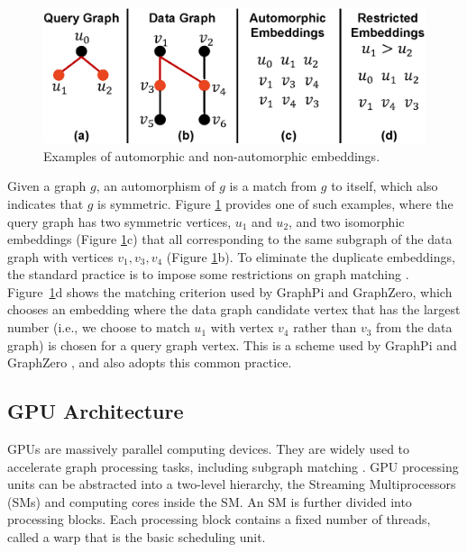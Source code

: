 \begin{figure}[t!]
\centering
\includegraphics[width=\columnwidth]{./figure/automorphism.eps}
\caption{Examples of automorphic and non-automorphic embeddings.}	
\label{fig:automo}
\end{figure}

 Given a graph $g$, an automorphism of $g$ is a match from $g$ to itself, which also indicates that $g$ is symmetric. Figure \ref{fig:automo} provides one of such examples, where the query graph has two symmetric vertices, $u_1$ and $u_2$, and two isomorphic embeddings (Figure \ref{fig:automo}c) that all corresponding to the same subgraph of the data graph with vertices $v_1, v_3, v_4$ (Figure \ref{fig:automo}b). To eliminate the duplicate embeddings, the standard practice is to impose some
restrictions on graph matching \cite{ mawhirter2019graphzero, shi2020graphpi}. Figure~\ref{fig:automo}d shows the matching criterion used
by GraphPi and GraphZero, which chooses an embedding where the data graph candidate vertex that has the largest number (i.e., we choose to
match $u_1$ with vertex $v_4$ rather than $v_3$ from the data graph) is chosen for a query graph vertex. This is a scheme used by GraphPi
\cite{shi2020graphpi} and GraphZero \cite{mawhirter2019graphzero}, and \SystemName also adopts this common practice.

\subsection{GPU Architecture\label{sec:gpu}}
GPUs are massively parallel computing devices. They are widely used to accelerate graph processing tasks, including subgraph matching
\cite{zeng2020gsi,guo2020exploiting,guo2020gpu}. GPU processing units can be abstracted into a two-level hierarchy, the Streaming
Multiprocessors (SMs) and computing cores inside the SM. An SM is further divided into processing blocks. Each processing block contains a
fixed number of threads, called a warp that is the basic scheduling unit.

